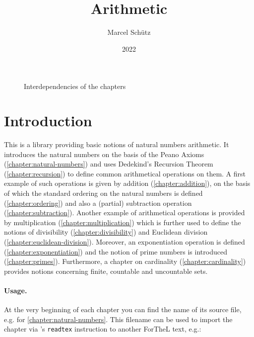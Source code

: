 \documentclass[12pt,oneside]{book}
\title{Arithmetic}
\author{Marcel Schütz}
\date{2022}
\begin{document}
  \maketitle

  \tableofcontents

  \paragraph*{}
  \begin{figure}[H]
    \centering
    \caption*{Interdependencies of the chapters}
  \end{figure}


  \section*{Introduction}

  This is a library providing basic notions of natural numbers arithmetic.
  It introduces the natural numbers on the basis of the Peano
  Axioms (\cref{chapter:natural-numbers}) and uses Dedekind's Recursion Theorem
  (\cref{chapter:recursion}) to define common arithmetical operations on them.
  A first example of such operations is given by addition
  (\cref{chapter:addition}), on the basis of which the standard ordering on the
  natural numbers is defined (\cref{chapter:ordering}) and also a (partial)
  subtraction operation (\cref{chapter:subtraction}).
  Another example of arithmetical operations is provided by multiplication
  (\cref{chapter:multiplication}) which is further used to define the notions of
  divisibility (\cref{chapter:divisibility}) and Euclidean division
  (\cref{chapter:euclidean-division}).
  Moreover, an exponentiation operation is defined
  (\cref{chapter:exponentiation}) and the notion of prime numbers is introduced
  (\cref{chapter:primes}).
  Furthermore, a chapter on cardinality (\cref{chapter:cardinality}) provides
  notions concerning finite, countable and uncountable sets.


  \paragraph*{Usage.}
  At the very beginning of each chapter you can find the name of its source
  file, e.g.  for
  \cref{chapter:natural-numbers}.
  This filename can be used to import the chapter via \Naproche's
  \texttt{readtex} instruction to another ForTheL text, e.g.:
\end{document}
